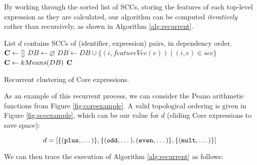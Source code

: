 By working through the sorted list of SCCs, storing the features of each top-level expression as they are calculated, our algorithm can be computed \emph{iteratively} rather than recursively, as shown in Algorithm \ref{alg:recurrent}.

\begin{algorithm}
  \begin{algorithmic}[1]
    \Require List $d$ contains SCCs of (identifier, expression) pairs, in dependency order.
      \State $\mathbf{C}  \gets []$
      \State $DB \gets \varnothing$
        \State $DB \gets DB \cup \{(i, featureVec(e)) \mid (i, e) \in scc\}$
        \State $\mathbf{C}  \gets kMeans(DB)$
      \EndFor
      \Return $\mathbf{C}$
    \EndProcedure
  \end{algorithmic}
  \caption{Recurrent clustering of Core expressions.}
  \label{alg:recurrent}
\end{algorithm}

\iffalse
As an example of this recurrent process, we can consider the Peano arithmetic functions from Figure \ref{fig:coreexample}. A valid topological ordering is given in Figure \ref{fig:sccexample}, which can be our value for $d$ (eliding Core expressions to save space):

\begin{equation}
  d = [\{(\texttt{plus}, \dots)\}, \{(\texttt{odd}, \dots), (\texttt{even}, \dots)\}, \{(\texttt{mult}, \dots)\}]
\end{equation}

We can then trace the execution of Algorithm \ref{alg:recurrent} as follows:

